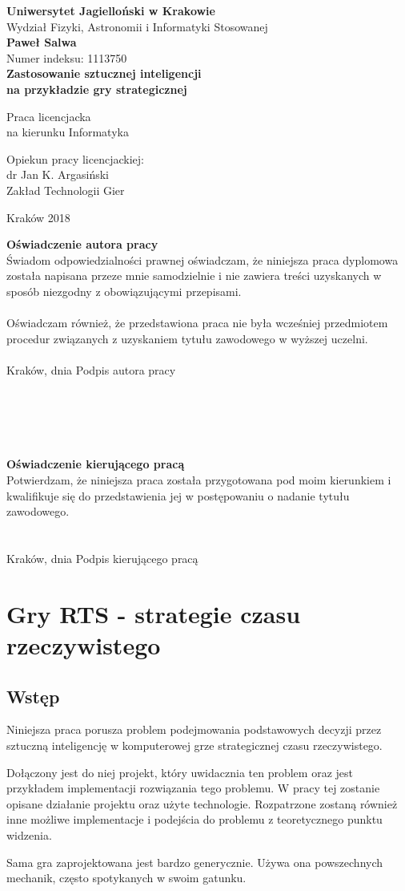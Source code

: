 \documentclass[12pt]{report}
\newcommand\blankpage{%
    \null
    \thispagestyle{empty}%
    \addtocounter{page}{-1}%
    \newpage}
\renewcommand{\maketitle}{

\begin{titlepage}
\begin{spacing}{1.0}
\begin{center}
\textbf{{\large Uniwersytet Jagielloński w Krakowie}}\\[0.5cm]
{\large Wydział Fizyki, Astronomii i Informatyki Stosowanej}\\[4cm]	
\textbf{{\Large Paweł Salwa}}\\[0.5cm]
{\normalsize Numer indeksu: 1113750}\\[2cm]
\textbf{{\LARGE 
Zastosowanie sztucznej inteligencji\\
na przykładzie gry strategicznej\\[.4cm]
}}

{\normalsize Praca licencjacka\\
na kierunku Informatyka}\\[4cm]
\begin{flushright}
{\normalsize Opiekun pracy licencjackiej:\\
dr Jan K. Argasiński\\
Zakład Technologii Gier}\\[1.0cm]
\end{flushright}
Kraków 2018
\end{center}
\end{spacing}

\thispagestyle{empty}
\noindent 

\pagebreak

\textbf{Oświadczenie autora pracy}\\
 
{\small 
\noindent
Świadom odpowiedzialności prawnej oświadczam, że niniejsza praca dyplomowa została napisana przeze mnie samodzielnie i nie zawiera treści uzyskanych w sposób niezgodny z obowiązującymi przepisami.\\
\\
\noindent
Oświadczam również, że przedstawiona praca nie była wcześniej przedmiotem procedur związanych z uzyskaniem tytułu zawodowego w wyższej uczelni.\\
\\
\noindent
Kraków, dnia \hfill Podpis autora pracy}\\
\\
\\
\\
\\
\\
\noindent 
\textbf{Oświadczenie kierującego pracą}\\

{\small
\noindent
Potwierdzam, że niniejsza praca została przygotowana pod moim kierunkiem i kwalifikuje się do przedstawienia jej w postępowaniu o nadanie tytułu zawodowego.\\
\\
\\
\noindent
Kraków, dnia \hfill Podpis kierującego pracą}
\thispagestyle{empty}


\end{titlepage}
}
\begin{document}
\maketitle
\tableofcontents
\chapter {Gry RTS - strategie czasu rzeczywistego}


\section {Wstęp}
Niniejsza praca porusza problem podejmowania podstawowych decyzji przez sztuczną inteligencję w komputerowej grze strategicznej czasu rzeczywistego. 

Dołączony jest do niej projekt, który uwidacznia ten problem oraz jest przykładem implementacji rozwiązania tego problemu. W pracy tej zostanie opisane działanie projektu oraz użyte technologie. Rozpatrzone zostaną również inne możliwe implementacje i podejścia do problemu z teoretycznego punktu widzenia.

Sama gra zaprojektowana jest bardzo generycznie. Używa ona powszechnych mechanik, często spotykanych w swoim gatunku.
\end{document}
